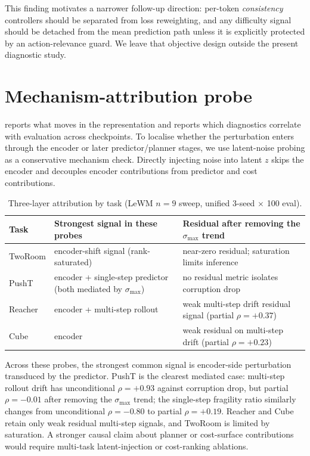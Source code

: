 \documentclass[10pt]{article}
\newcommand{\stdmax}{\ensuremath{\sigma_{\max}}}
\newcommand{\fragility}{fragility ratio}
\begin{document}
This finding motivates a narrower follow-up direction: per-token \emph{consistency} controllers should be separated from loss reweighting, and any difficulty signal should be detached from the mean prediction path unless it is explicitly protected by an action-relevance guard. We leave that objective design outside the present diagnostic study.

\section{Mechanism-attribution probe}\label{sec:appendix-mech-attribution}

 reports what moves in the representation and  reports which diagnostics correlate with evaluation across checkpoints. To localise whether the perturbation enters through the encoder or later predictor/planner stages, we use latent-noise probing as a conservative mechanism check. Directly injecting noise into latent $z$ skips the encoder and decouples encoder contributions from predictor and cost contributions.

\begin{table}[H]
\centering
\caption{Three-layer attribution by task (LeWM $n = 9$ sweep, unified 3-seed $\times$ 100 eval).}
\label{tab:attribution}
\small
\setlength{\tabcolsep}{6pt}
\begin{tabularx}{\textwidth}{l X X}
\toprule
Task & Strongest signal in these probes & Residual after removing the \stdmax{} trend \\
\midrule
TwoRoom & encoder-shift signal (rank-saturated) & near-zero residual; saturation limits inference \\
PushT   & encoder + single-step predictor (both mediated by \stdmax{}) & no residual metric isolates corruption drop \\
Reacher & encoder + multi-step rollout & weak multi-step drift residual signal (partial $\rho = +0.37$) \\
Cube    & encoder & weak residual on multi-step drift (partial $\rho = +0.23$) \\
\bottomrule
\end{tabularx}
\end{table}

Across these probes, the strongest common signal is encoder-side perturbation transduced by the predictor. PushT is the clearest mediated case: multi-step rollout drift has unconditional $\rho=+0.93$ against corruption drop, but partial $\rho=-0.01$ after removing the \stdmax{} trend; the single-step \fragility{} similarly changes from unconditional $\rho=-0.80$ to partial $\rho=+0.19$. Reacher and Cube retain only weak residual multi-step signals, and TwoRoom is limited by saturation. A stronger causal claim about planner or cost-surface contributions would require multi-task latent-injection or cost-ranking ablations.
\end{document}
